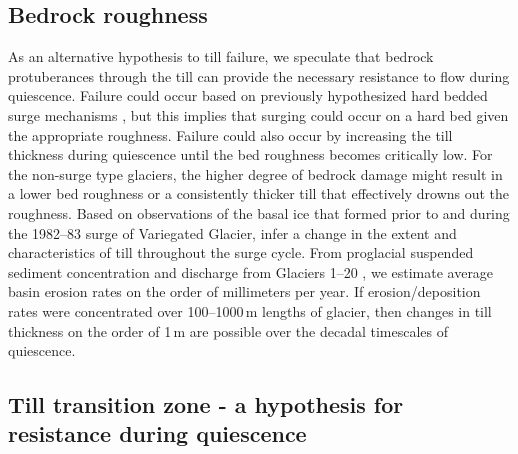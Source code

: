\documentclass[review]{igs}
\begin{document}
\subsection{Bedrock roughness}
As an alternative hypothesis to till failure, we speculate that bedrock protuberances through the till can provide the necessary resistance to flow during quiescence. Failure could occur based on previously hypothesized hard bedded surge mechanisms \citep[e.g.][]{Fowler1987,Kamb1987}, but this implies that surging could occur on a hard bed given the appropriate roughness. Failure could also occur by increasing the till thickness during quiescence until the bed roughness becomes critically low. For the non-surge type glaciers, the higher degree of bedrock damage might result in a lower bed roughness or a consistently thicker till that effectively drowns out the roughness. 
Based on observations of the basal ice that formed prior to and during the 1982--83 surge of Variegated Glacier, \cite{Sharp1994} infer a change in the extent and characteristics of till throughout the surge cycle. From proglacial suspended sediment concentration and discharge from Glaciers 1--20 \citep{Crompton2016}, we estimate average basin erosion rates on the order of millimeters per year. If erosion/deposition rates were concentrated over 100--1000\,m lengths of glacier, then changes in till thickness on the order of 1\,m are possible over the decadal timescales of quiescence.  

\subsection{Till transition zone - a hypothesis for resistance during quiescence}

\end{document}
